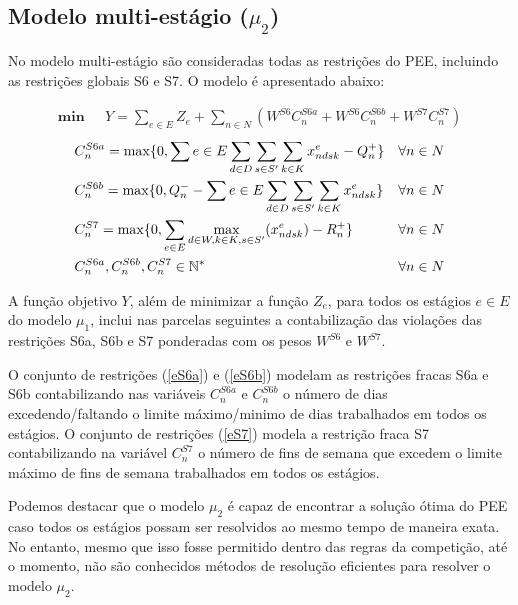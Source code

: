 \documentclass[cic,tc, twoside]{iiufrgs}
\begin{document}
\subsection{Modelo multi-estágio ($\mu_2$)}\label{multiestagio}

No modelo multi-estágio são consideradas todas as restrições do PEE, incluindo as restrições globais S6 e S7. O modelo é apresentado abaixo:

\begin{align}
   \textbf{min~~}  &Y =  \sum_{e \in E} Z_e + \sum_{n \in N} (W^{S6} C^{S6a}_n + W^{S6} C^{S6b}_n + W^{S7} C^{S7}_n) 
\end{align}                     
\begin{align}
& C^{S6a}_n =  \max\{0, \sum{e \in E}\sum_{d \in D} \sum_{s \in S'}\sum_{k \in K} x^e_{ndsk} - Q^+_{n}\} && \forall n \in N \label{eS6a}\\
& C^{S6b}_n =  \max\{0, Q^-_{n} - \sum{e \in E}\sum_{d \in D} \sum_{s \in S'}\sum_{k \in K} x^e_{ndsk}\} && \forall n \in N \label{eS6b}\\
& C^{S7}_n =  \max\{0,\sum_{e \in E}\max_{d \in W, k \in K, s \in S'} (x^e_{ndsk}) - R^+_{n}\}  && \forall n \in N \label{eS7} \\
& C^{S6a}_{n}, C^{S6b}_{n}, C^{S7}_{n} \in \mathbb{N^*} && \forall n \in N \notag
\end{align}

A função objetivo $Y$, além de minimizar a função $Z_e$, para todos os estágios $e \in E$ do modelo $\mu_1$, inclui nas parcelas seguintes a contabilização das violações das restrições S6a, S6b e S7 ponderadas com os pesos $W^{S6}$ e $W^{S7}$.

O conjunto de restrições (\ref{eS6a}) e (\ref{eS6b}) modelam as restrições fracas S6a e S6b contabilizando nas variáveis $C^{S6a}_n$ e $C^{S6b}_n$ o número de dias excedendo/faltando o limite máximo/minimo de dias trabalhados em todos os estágios. 
O conjunto de restrições (\ref{eS7}) modela a restrição fraca S7 contabilizando na variável $C^{S7}_n$ o número de fins de semana que excedem o limite máximo de fins de semana trabalhados em todos os estágios. 

Podemos destacar que o modelo $\mu_2$ é capaz de encontrar a solução ótima do PEE caso todos os estágios possam ser resolvidos ao mesmo tempo de maneira exata. No entanto, mesmo que isso fosse permitido dentro das regras da competição, até o momento, não são conhecidos métodos de resolução eficientes para resolver o modelo $\mu_2$.
\end{document}
